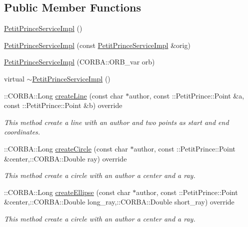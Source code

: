 \subsection*{Public Member Functions}
\begin{DoxyCompactItemize}
\item 
\hyperlink{class_petit_prince_service_impl_acb11d35aba248f3ce9ea1a2d9cd654a8}{Petit\+Prince\+Service\+Impl} ()
\item 
\hyperlink{class_petit_prince_service_impl_ac8dc71f547e35e7bb9258e295070cb57}{Petit\+Prince\+Service\+Impl} (const \hyperlink{class_petit_prince_service_impl}{Petit\+Prince\+Service\+Impl} \&orig)
\item 
\hyperlink{class_petit_prince_service_impl_a32477f50eef22f4d24f0992da6199ae8}{Petit\+Prince\+Service\+Impl} (C\+O\+R\+B\+A\+::\+O\+R\+B\+\_\+var orb)
\item 
virtual \hyperlink{class_petit_prince_service_impl_af2198ec89de73b22c98f9944f3b5912f}{$\sim$\+Petit\+Prince\+Service\+Impl} ()
\item 
\+::C\+O\+R\+B\+A\+::\+Long \hyperlink{class_petit_prince_service_impl_a8f30a969622fa0ca7bc88ee5d72bc51c}{create\+Line} (const char $\ast$author, const \+::Petit\+Prince\+::\+Point \&a, const \+::Petit\+Prince\+::\+Point \&b) override
\begin{DoxyCompactList}\small\item\em This method create a line with an author and two points as start and end coordinates. \end{DoxyCompactList}\item 
\+::C\+O\+R\+B\+A\+::\+Long \hyperlink{class_petit_prince_service_impl_a62369775140e067970bbdf544392714c}{create\+Circle} (const char $\ast$author, const \+::Petit\+Prince\+::\+Point \&center,\+::C\+O\+R\+B\+A\+::\+Double ray) override
\begin{DoxyCompactList}\small\item\em This method create a circle with an author a center and a ray. \end{DoxyCompactList}\item 
\+::C\+O\+R\+B\+A\+::\+Long \hyperlink{class_petit_prince_service_impl_ad69b464b23df4495e29387d07811a2d2}{create\+Ellipse} (const char $\ast$author, const \+::Petit\+Prince\+::\+Point \&center,\+::C\+O\+R\+B\+A\+::\+Double long\+\_\+ray,\+::C\+O\+R\+B\+A\+::\+Double short\+\_\+ray) override
\begin{DoxyCompactList}\small\item\em This method create a circle with an author a center and a ray. \end{DoxyCompactList}\item 

\end{DoxyCompactItemize}
